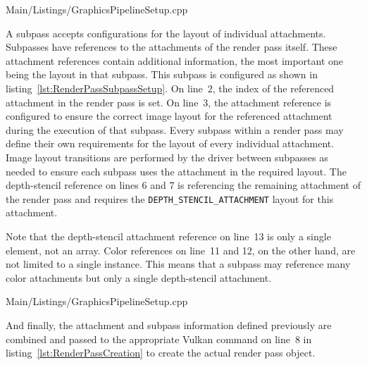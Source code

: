         
        {Main/Listings/GraphicsPipelineSetup.cpp}

        A subpass accepts configurations for the layout of individual attachments.
        Subpasses have references to the attachments of the render pass itself.
        These attachment references contain additional information, the most important one being the layout in that subpass.
        This subpass is configured as shown in listing~\ref{lst:RenderPassSubpassSetup}.
        On line~2, the index of the referenced attachment in the render pass is set.
        On line~3, the attachment reference is configured to ensure the correct image layout for the referenced attachment during the execution of that subpass.
        Every subpass within a render pass may define their own requirements for the layout of every individual attachment.
        Image layout transitions are performed by the \gls{driver} between subpasses as needed to ensure each subpass uses the attachment in the required layout.
        The depth-stencil reference on lines 6 and 7 is referencing the remaining attachment of the render pass and requires the \lstinline{DEPTH_STENCIL_ATTACHMENT} layout for this attachment.

        Note that the depth-stencil attachment reference on line~13 is only a single element, not an array.
        Color references on line~11 and 12, on the other hand, are not limited to a single instance.
        This means that a subpass may reference many color attachments but only a single depth-stencil attachment.

        
        {Main/Listings/GraphicsPipelineSetup.cpp}

        And finally, the attachment and subpass information defined previously are combined and passed to the appropriate Vulkan command on line~8 in listing~\ref{lst:RenderPassCreation} to create the actual render pass object.

